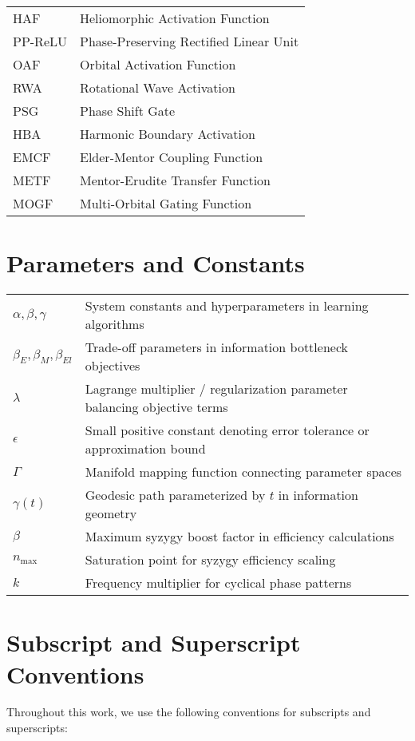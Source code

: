\begin{tabular}{p{3cm} p{12cm}}
HAF & Heliomorphic Activation Function \\
PP-ReLU & Phase-Preserving Rectified Linear Unit \\
OAF & Orbital Activation Function \\
RWA & Rotational Wave Activation \\
PSG & Phase Shift Gate \\
HBA & Harmonic Boundary Activation \\
EMCF & Elder-Mentor Coupling Function \\
METF & Mentor-Erudite Transfer Function \\
MOGF & Multi-Orbital Gating Function \\
\end{tabular}

\section*{Parameters and Constants}

\begin{tabular}{p{3cm} p{12cm}}
$\alpha, \beta, \gamma$ & System constants and hyperparameters in learning algorithms \\
$\beta_E, \beta_M, \beta_{El}$ & Trade-off parameters in information bottleneck objectives \\
$\lambda$ & Lagrange multiplier / regularization parameter balancing objective terms \\
$\epsilon$ & Small positive constant denoting error tolerance or approximation bound \\
$\Gamma$ & Manifold mapping function connecting parameter spaces \\
$\gamma(t)$ & Geodesic path parameterized by $t$ in information geometry \\
$\beta$ & Maximum syzygy boost factor in efficiency calculations \\
$n_{\text{max}}$ & Saturation point for syzygy efficiency scaling \\
$k$ & Frequency multiplier for cyclical phase patterns \\
\end{tabular}

\section*{Subscript and Superscript Conventions}

Throughout this work, we use the following conventions for subscripts and superscripts:

